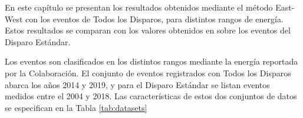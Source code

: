

En este capítulo se presentan los resultados obtenidos mediante el método East-West con los eventos de Todos los Disparos, para  distintos rangos de energía. Estos resultados se comparan con los valores obtenidos en \cite{Aab_2020} sobre los eventos  del Disparo Estándar. 

Los eventos son clasificados en los distintos rangos mediante la energía reportada por la Colaboración. El conjunto de eventos registrados con Todos los Disparos abarca los años 2014 y 2019, y para el Disparo Estándar se listan eventos medidos entre el 2004 y 2018. Las características de estos dos conjuntos de datos se especifican en la Tabla \ref{tab:datasets}

